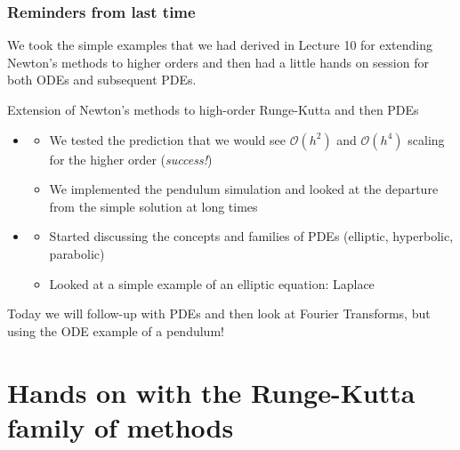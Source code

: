 \documentclass[hyperref={colorlinks=true}]{beamer}
\begin{document}
\begin{frame}%
  \frametitle{Reminders from last time}

  We took the simple examples that we had derived in Lecture 10 for extending Newton's methods to higher orders and then had a little hands on session for both ODEs and subsequent PDEs.
  
  \vspace{0.3cm}
  
  \begin{ucblock}{Extension of Newton's methods to high-order Runge-Kutta and then PDEs}
    \begin{itemize}
      \item {} 
      \begin{itemize}
        \item We tested the prediction that we would see $\mathcal{O}(h^2)$ and $\mathcal{O}(h^4)$ scaling for the higher order (\textit{success!})
        \item We implemented the pendulum simulation and looked at the departure from the simple solution at long times
      \end{itemize}
      \item {} 
      \begin{itemize}
        \item Started discussing the concepts and families of PDEs (elliptic, hyperbolic, parabolic)
        \item Looked at a simple example of an elliptic equation: Laplace
      \end{itemize}
    \end{itemize}
  \end{ucblock}
  
  \mysp
  
  Today we will follow-up with PDEs and then look at Fourier Transforms, but using the ODE example of a pendulum!

\end{frame}


\section[Hands on with the Runge-Kutta family of methods]{Hands on with the Runge-Kutta family of methods}
\end{document}

